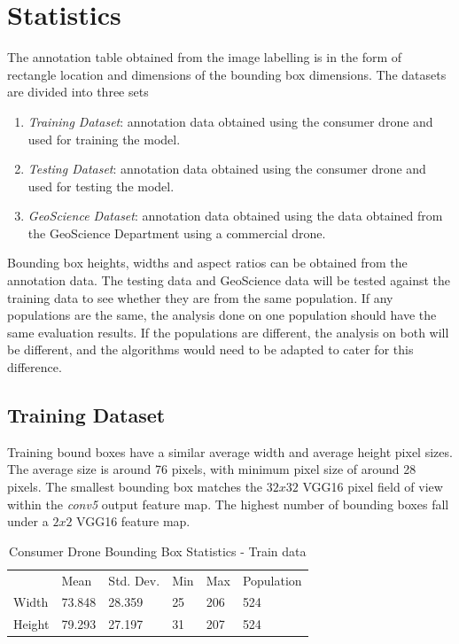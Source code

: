 \documentclass{article}
\begin{document}
\section{Statistics}

The annotation table obtained from the image labelling is in the form of rectangle location and dimensions of the bounding box dimensions. The datasets are divided into three sets
\begin{enumerate}
\item \textit{Training Dataset}: annotation data obtained using the consumer drone and used for training the model.
\item \textit{Testing Dataset}: annotation data obtained using the consumer drone and used for testing the model.
\item \textit{GeoScience Dataset}: annotation data obtained using the data obtained from the GeoScience Department using a commercial drone.
\end{enumerate}

Bounding box heights, widths and aspect ratios can be obtained from the annotation data. The testing data and GeoScience data will be tested against the training data to see whether they are from the same population. If any populations are the same, the analysis done on one population should have the same evaluation results. If the populations are different, the analysis on both will be different, and the algorithms would need to be adapted to cater for this difference.

\subsection{Training Dataset}

Training bound boxes have a similar average width and average height pixel sizes. The average size is around 76 pixels, with minimum pixel size of around 28 pixels. The smallest bounding box matches the $32x32$ VGG16 pixel field of view within the \textit{conv5} output feature map. The highest number of bounding boxes fall under a $2x2$ VGG16 feature map.

\begin{table}[ht]
\caption{Consumer Drone Bounding Box Statistics - Train data}
\centering
\begin{tabular}{llllll}
       & Mean   & Std. Dev. & Min & Max & Population \\
Width  & 73.848 & 28.359 & 25 & 206  & 524 \\
Height & 79.293 & 27.197 & 31 & 207  & 524
\end{tabular}
\end{table}
\end{document}
